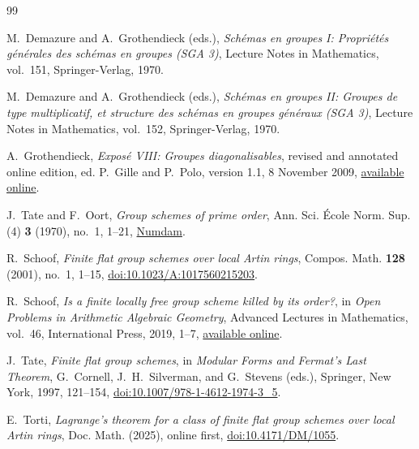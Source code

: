 \documentclass[11pt]{amsart}
\theoremstyle{remark}
\begin{document}
\begin{thebibliography}{99}

M.~Demazure and A.~Grothendieck (eds.),
\emph{Sch\'emas en groupes I: Propri\'et\'es g\'en\'erales des sch\'emas
en groupes (SGA 3)},
Lecture Notes in Mathematics, vol.~151, Springer-Verlag, 1970.

M.~Demazure and A.~Grothendieck (eds.),
\emph{Sch\'emas en groupes II: Groupes de type multiplicatif, et structure
des sch\'emas en groupes g\'en\'eraux (SGA 3)},
Lecture Notes in Mathematics, vol.~152, Springer-Verlag, 1970.

A.~Grothendieck,
\emph{Expos\'e VIII: Groupes diagonalisables},
revised and annotated online edition, ed. P.~Gille and P.~Polo,
version 1.1, 8 November 2009,
\href{https://wstein.org/sga/SGA3/Exp8-8nov09.pdf}
{available online}.

J.~Tate and F.~Oort,
\emph{Group schemes of prime order},
Ann. Sci. \'Ecole Norm. Sup. (4) \textbf{3} (1970), no.~1, 1--21,
\href{https://www.numdam.org/item/ASENS_1970_4_3_1_1_0/}
{Numdam}.

R.~Schoof,
\emph{Finite flat group schemes over local Artin rings},
Compos. Math. \textbf{128} (2001), no.~1, 1--15,
\href{https://doi.org/10.1023/A:1017560215203}
{doi:10.1023/A:1017560215203}.

R.~Schoof,
\emph{Is a finite locally free group scheme killed by its order?},
in \emph{Open Problems in Arithmetic Algebraic Geometry},
Advanced Lectures in Mathematics, vol.~46, International Press, 2019,
1--7,
\href{https://www.mat.uniroma2.it/~schoof/schoof_oortAAG.pdf}
{available online}.

J.~Tate,
\emph{Finite flat group schemes},
in \emph{Modular Forms and Fermat's Last Theorem},
G.~Cornell, J.~H.~Silverman, and G.~Stevens (eds.),
Springer, New York, 1997, 121--154,
\href{https://doi.org/10.1007/978-1-4612-1974-3_5}
{doi:10.1007/978-1-4612-1974-3\_5}.

E.~Torti,
\emph{Lagrange's theorem for a class of finite flat group schemes over
local Artin rings},
Doc. Math. (2025), online first,
\href{https://doi.org/10.4171/DM/1055}{doi:10.4171/DM/1055}.

\end{thebibliography}
\end{document}
